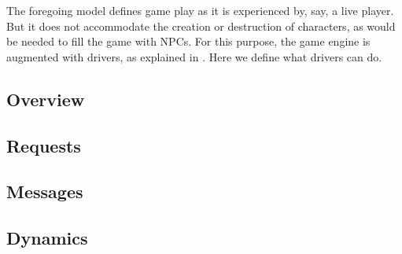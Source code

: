 The foregoing model defines game play as it is experienced by, say, a
live player. But it does not accommodate the creation or destruction
of characters, as would be needed to fill the game with NPCs. For this
purpose, the game engine is augmented with drivers, as explained in
. Here we define what drivers can do.

\subsection{Overview}


\subsection{Requests}

\subsection{Messages}

\subsection{Dynamics}
